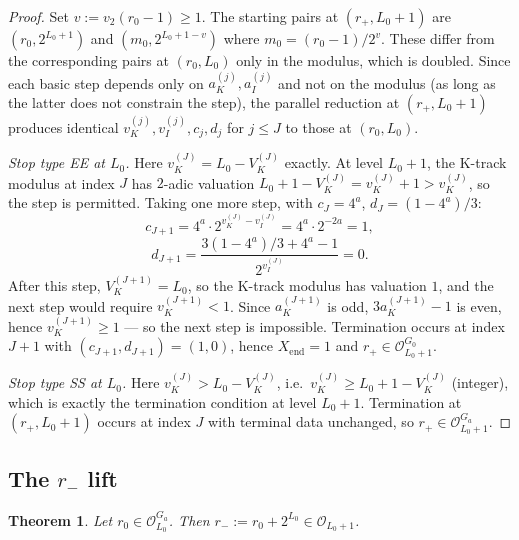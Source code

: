 \documentclass[11pt,reqno]{amsart}
\theoremstyle{plain}
\newtheorem{theorem}{Theorem}[section]
\theoremstyle{definition}
\theoremstyle{remark}
\newcommand{\Obs}{\mathcal{O}}
\newcommand{\Xend}{X_{\mathrm{end}}}
\newcommand{\Vk}{V_{K}}
\newcommand{\vk}{v_{K}}
\newcommand{\vi}{v_{I}}
\newcommand{\vtwo}{v_{2}}
\begin{document}
\begin{proof}
Set $v := \vtwo(r_0 - 1) \ge 1$.
The starting pairs at $(r_+, L_0+1)$ are $(r_0, 2^{L_0+1})$ and
$(m_0, 2^{L_0+1-v})$ where $m_0 = (r_0 - 1)/2^v$. These differ from the
corresponding pairs at $(r_0, L_0)$ only in the modulus, which is doubled.
Since each basic step depends only on $a_K^{(j)}, a_I^{(j)}$ and not on
the modulus (as long as the latter does not constrain the step), the
parallel reduction at $(r_+, L_0+1)$ produces identical
$\vk^{(j)}, \vi^{(j)}, c_j, d_j$ for $j \le J$ to those at $(r_0, L_0)$.

\emph{Stop type EE at $L_0$.} Here $\vk^{(J)} = L_0 - \Vk^{(J)}$ exactly. At
level $L_0 + 1$, the K-track modulus at index $J$ has $2$-adic valuation
$L_0 + 1 - \Vk^{(J)} = \vk^{(J)} + 1 > \vk^{(J)}$, so the step is permitted.
Taking one more step, with $c_J = 4^a$, $d_J = (1 - 4^a)/3$:
\[
c_{J+1} = 4^a \cdot 2^{\vk^{(J)} - \vi^{(J)}} = 4^a \cdot 2^{-2a} = 1,
\]
\[
d_{J+1} = \frac{3(1 - 4^a)/3 + 4^a - 1}{2^{\vi^{(J)}}} = 0.
\]
After this step, $\Vk^{(J+1)} = L_0$, so the K-track modulus has
valuation $1$, and the next step would require $\vk^{(J+1)} < 1$. Since
$a_K^{(J+1)}$ is odd, $3 a_K^{(J+1)} - 1$ is even, hence
$\vk^{(J+1)} \ge 1$ — so the next step is impossible. Termination
occurs at index $J+1$ with
$(c_{J+1}, d_{J+1}) = (1, 0)$, hence $\Xend = 1$ and
$r_+ \in \Obs_{L_0+1}^{G_0}$.

\emph{Stop type SS at $L_0$.} Here $\vk^{(J)} > L_0 - \Vk^{(J)}$, i.e.\
$\vk^{(J)} \ge L_0 + 1 - \Vk^{(J)}$ (integer), which is exactly the
termination condition at level $L_0 + 1$. Termination at $(r_+, L_0+1)$
occurs at index $J$ with terminal data unchanged, so
$r_+ \in \Obs_{L_0+1}^{G_a}$. \qedhere
\end{proof}

\subsection{The \texorpdfstring{$r_-$}{r-} lift}

\begin{theorem}\label{thm:lift-minus}
Let $r_0 \in \Obs_{L_0}^{G_a}$. Then $r_- := r_0 + 2^{L_0} \in \Obs_{L_0+1}$.
\end{theorem}
\end{document}
